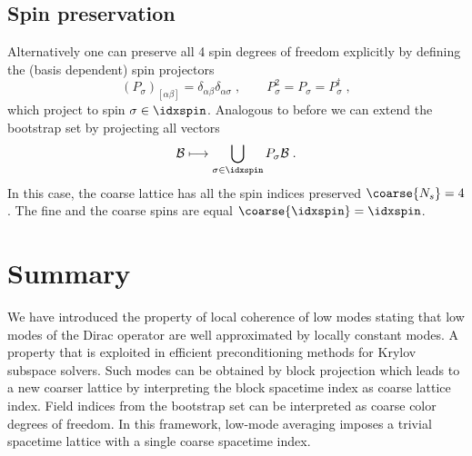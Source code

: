 \subsection{Spin preservation}

Alternatively one can preserve all \num{4} spin degrees of freedom explicitly by defining the (basis dependent) spin projectors
\begin{equation} \label{eq:spin:projectors}
(P_{\sigma})_{[\alpha \beta]} = \delta_{\alpha \beta} \delta_{\alpha \sigma} \;,
\qquad
P_{\sigma}^{2} = P_{\sigma} = P_{\sigma}^{\dagger} \;,
\end{equation}
which project to spin $\sigma \in \idxspin$.
Analogous to before we can extend the bootstrap set by projecting all vectors
\begin{equation} \label{eq:bootstrap:spin}
\mathcal{B} \longmapsto \bigcup_{\sigma \in \idxspin} P_{\sigma} \mathcal{B} \;.
\end{equation}
In this case, the coarse lattice has all the spin indices preserved $\coarse{N_s} = 4$.
The fine and the coarse spins are equal $\coarse{\idxspin} = \idxspin$.

\section{Summary}
\label{sec:lc:summary}

We have introduced the property of local coherence of low modes stating that low modes of the Dirac operator are well approximated by locally constant modes.
A property that is exploited in efficient preconditioning methods for Krylov subspace solvers.
Such modes can be obtained by block projection which leads to a new coarser lattice by interpreting the block spacetime index as coarse lattice index.
Field indices from the bootstrap set can be interpreted as coarse color degrees of freedom.
In this framework, low-mode averaging imposes a trivial spacetime lattice with a single coarse spacetime index.

